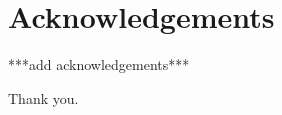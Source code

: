 \chapter{Acknowledgements}
\label{chpr:acknowledgement}

***add acknowledgements***

\bigskip
\noindent

\bigskip 
\noindent
Thank you.
